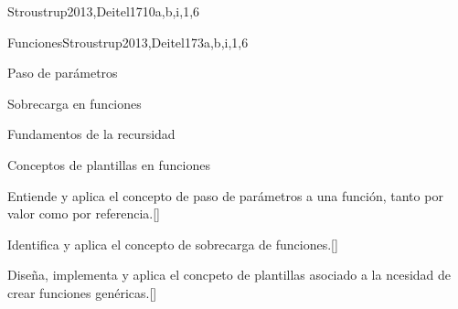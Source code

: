 \begin{syllabus}
\begin{unit}{\SDFFundamentalProgrammingConcepts}{}{Stroustrup2013,Deitel17}{10}{a,b,i,1,6}
\begin{topics}
    \end{topics}
    \begin{learningoutcomes}
        \item \SDFFundamentalProgrammingConceptsLOAnalyzeAndBehavior [\Assessment]
        \item \SDFFundamentalProgrammingConceptsLOIdentifyAndOf [\Familiarity]
        \item \SDFFundamentalProgrammingConceptsLOWritePrograms [\Usage]
        \item \SDFFundamentalProgrammingConceptsLOModify [\Usage]
        \item \SDFFundamentalProgrammingConceptsLODesignImplement [\Usage]
        \item \SDFFundamentalProgrammingConceptsLOChooseAppropriateIteration [\Assessment]

    \end{learningoutcomes}
\end{unit}

\begin{unit}{Funciones}{}{Stroustrup2013,Deitel17}{3}{a,b,i,1,6}
    \begin{topics}
        \item \SDFFundamentalProgrammingConceptsTopicFunctions
        \item Paso de parámetros
        \item Sobrecarga en funciones
        \item Fundamentos de la recursidad 
        \item Conceptos de plantillas en funciones
    \end{topics}
    \begin{learningoutcomes}
        \item  \SDFFundamentalProgrammingConceptsLODesignImplement [\Usage]
        \item  Entiende y aplica el concepto de paso de parámetros a una función, tanto por valor como por referencia.[\Usage]
        \item  Identifica y aplica el concepto de sobrecarga de funciones.[\Usage]
        \item  \SDFFundamentalProgrammingConceptsLODescribeTheRecursion [\Familiarity]
        \item  Diseña, implementa y aplica el concpeto de plantillas asociado a la ncesidad de crear funciones genéricas.[\Usage]


\end{learningoutcomes}
\end{unit}
\end{syllabus}
